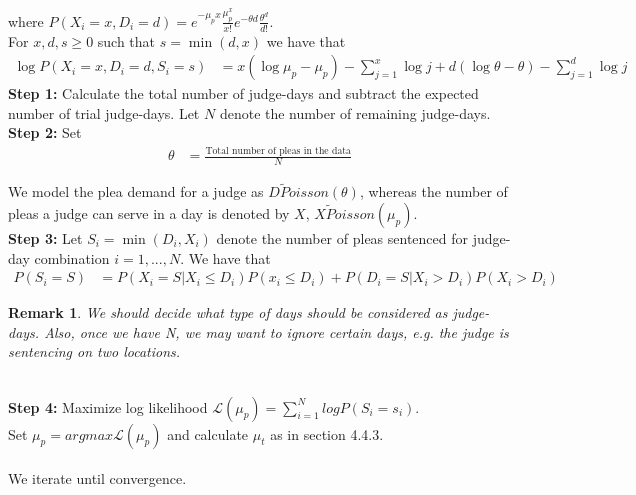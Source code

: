 \documentclass[11pt, oneside]{article}   	%
\theoremstyle{ModifiedStyle}
\newtheorem{remark}{Remark}
\begin{document}
where $P(X_i=x,D_i=d) = e^{-\mu_px}\frac{\mu_p^x}{x!} e^{-\theta d} \frac{\theta^d}{d!}$.\\
For $x,d,s \geq 0$ such that $s=\min(d,x)$ we have that
\begin{align}
	\log P(X_i=x,D_i=d,S_i=s) &= x(\log \mu_p - \mu_p) - \sum_{j=1}^x \log j + d(\log\theta - \theta) - \sum_{j=1}^d \log j
\end{align}
\textbf{Step 1:} Calculate the total number of judge-days and subtract the expected number of trial judge-days. Let $N$ denote the number of remaining judge-days.\\
\textbf{Step 2:} Set
\begin{align*}
	\theta &= \frac{\text{Total number of pleas in the data}}{N}
\end{align*}

We model the plea demand for a judge as $D \tilde Poisson(\theta)$, whereas the number of pleas a judge can serve in a day is denoted by $X$, $X \tilde Poisson(\mu_p)$.\\

\textbf{Step 3:} Let $S_i = \min(D_i,X_i)$ denote the number of pleas sentenced for judge-day combination $i=1,...,N$. We have that
\begin{align*}
	P(S_i = S) &= P(X_i = S | X_i \leq D_i) P(x_i \leq D_i) + P(D_i = S | X_i > D_i) P(X_i > D_i)
\end{align*}

\begin{remark}
	We should decide what type of days should be considered as judge-days. Also, once we have N, we may want to ignore certain days, e.g. the judge is sentencing on two locations.
\end{remark} \\

\textbf{Step 4:} Maximize log likelihood $\mathscr{L}(\mu_p) = \sum_{i=1}^N log P(S_i = s_i)$. \\
Set $\mu_p = argmax \mathscr{L}(\mu_p)$ and calculate $\mu_t$ as in section 4.4.3. \\
\\
We iterate until convergence.
\end{document}
